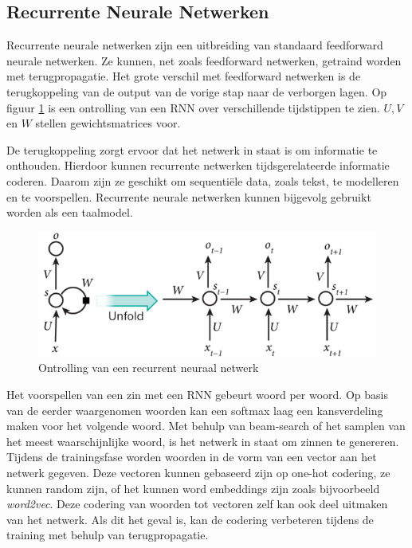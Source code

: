 \subsection{Recurrente Neurale Netwerken}
Recurrente neurale netwerken zijn een uitbreiding van standaard feedforward neurale netwerken. Ze kunnen, net zoals feedforward netwerken, getraind worden met terugpropagatie. Het grote verschil met feedforward netwerken is de terugkoppeling van de output van de vorige stap naar de verborgen lagen. Op figuur \ref{fig:rnn} is een ontrolling van een RNN over verschillende tijdstippen te zien. $U,V$ en $W$ stellen gewichtsmatrices voor.

De terugkoppeling zorgt ervoor dat het netwerk in staat is om informatie te onthouden. Hierdoor kunnen recurrente netwerken tijdsgerelateerde informatie coderen. Daarom zijn ze geschikt om sequenti\"ele data, zoals tekst, te modelleren en te voorspellen. Recurrente neurale netwerken kunnen bijgevolg gebruikt worden als een taalmodel.

\begin{figure}[tb]
    \centering
    \includegraphics[width=\linewidth]{Images/rnn.PNG}
    \caption{Ontrolling van een recurrent neuraal netwerk}
    \label{fig:rnn}
\end{figure}

Het voorspellen van een zin met een RNN gebeurt woord per woord. Op basis van de eerder waargenomen woorden kan een softmax laag een kansverdeling maken voor het volgende woord. Met behulp van beam-search of het samplen van het meest waarschijnlijke woord, is het netwerk in staat om zinnen te genereren. Tijdens de trainingsfase worden woorden in de vorm van een vector aan het netwerk gegeven. Deze vectoren kunnen gebaseerd zijn op one-hot codering, ze kunnen random zijn, of het kunnen word embeddings zijn zoals bijvoorbeeld \emph{word2vec}\cite{Mikolov2013}. Deze codering van woorden tot vectoren zelf kan ook deel uitmaken van het netwerk. Als dit het geval is, kan de codering verbeteren tijdens de training met behulp van terugpropagatie.

